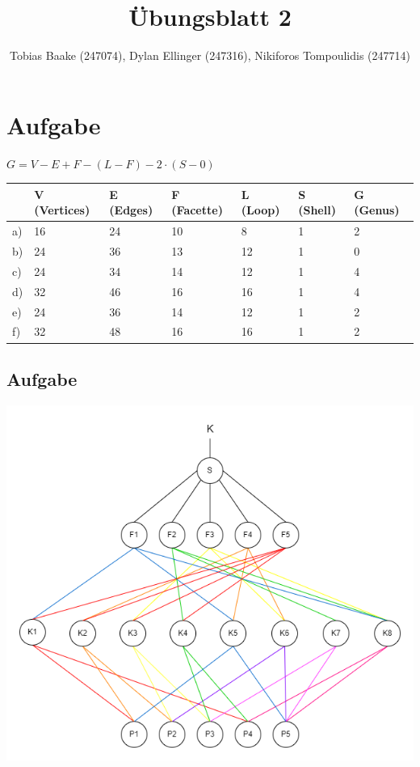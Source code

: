 \documentclass{article}
\title{Übungsblatt 2}
\author{Tobias Baake (247074), Dylan Ellinger (247316), Nikiforos Tompoulidis (247714)}
\begin{document}
\maketitle

\section{Aufgabe}

$G = V - E + F - (L - F) - 2 \cdot (S - 0)$

\begin{table}[!ht]
    \centering
    \begin{tabular}{|l|l|l|l|l|l|l|}
    \hline
         \  & V (Vertices) & E (Edges) & F (Facette) & L (Loop) & S (Shell) & G (Genus)  \\ \hline
        a) & 16 & 24 & 10 & 8 & 1 & 2 \\ \hline
        b) & 24 & 36 & 13 & 12 & 1 & 0 \\ \hline
        c) & 24 & 34 & 14 & 12 & 1 & 4 \\ \hline
        d) & 32 & 46 & 16 & 16 & 1 & 4 \\ \hline
        e) & 24 & 36 & 14 & 12 & 1 & 2 \\ \hline
        f) & 32 & 48 & 16 & 16 & 1 & 2 \\ \hline
    \end{tabular}
\end{table}

\subsection{Aufgabe}
\includegraphics[width=400pt]{./files/Übung2.2.drawio.png}
\end{document}

